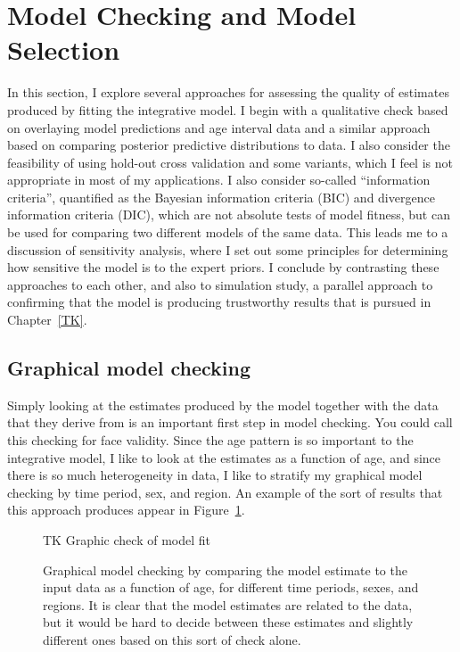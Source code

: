 \section{Model Checking and Model Selection}
\label{theory-model_checking}

In this section, I explore several approaches for assessing the
quality of estimates produced by fitting the integrative model.  I
begin with a qualitative check based on overlaying model predictions
and age interval data and a similar approach based on comparing
posterior predictive distributions to data.  I also consider the
feasibility of using hold-out cross validation and some variants,
which I feel is not appropriate in most of my applications.  I also
consider so-called ``information criteria'', quantified as the
Bayesian information criteria (BIC) and divergence information
criteria (DIC), which are not absolute tests of model fitness, but can
be used for comparing two different models of the same data.  This
leads me to a discussion of sensitivity analysis, where I set out
some principles for determining how sensitive the model is to the expert
priors.  I conclude by contrasting these approaches to each other, and
also to simulation study, a parallel approach to confirming that the
model is producing trustworthy results that is pursued in
Chapter~\ref{TK}.

\subsection{Graphical model checking}
Simply looking at the estimates produced by the model together with
the data that they derive from is an important first step in model
checking.  You could call this checking for face validity.  Since the
age pattern is so important to the integrative model, I like to look
at the estimates as a function of age, and since there is so much
heterogeneity in data, I like to stratify my graphical model checking
by time period, sex, and region.  An example of the sort of results
that this approach produces appear in Figure~\ref{graphical-model-checking}.

\begin{figure}
\begin{center}
TK Graphic check of model fit
\end{center}
\caption{Graphical model checking by comparing the model estimate to
  the input data as a function of age, for different time periods,
  sexes, and regions.  It is clear that the model estimates are
  related to the data, but it would be hard to decide between these
  estimates and slightly different ones based on this sort of check
  alone.}
\label{graphical-model-checking}
\end{figure}

